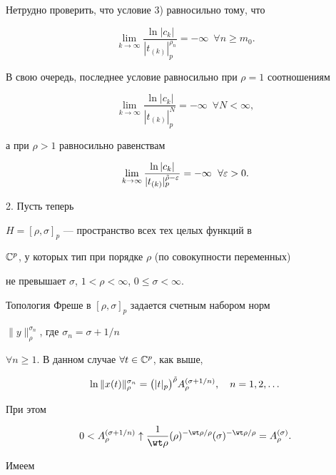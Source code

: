 Нетрудно проверить, что условие 3) равносильно тому, что


$$


\lim\limits_{k\to\infty}\dfrac{\ln|c_k|}{|t_{(k)}|_p^{\rho_n}}


= -\infty \ \; \forall n\geqslant m_0 .


$$


В свою очередь, последнее условие равносильно при $\rho=1$ соотношениям


$$


\lim\limits_{k\to\infty}\dfrac{\ln|c_k|}{|t_{(k)}|_p^N}


= -\infty\ \; \forall N<\infty,


$$


а при $\rho>1$ равносильно равенствам


$$


\lim\limits_{k\to\infty}\dfrac{\ln|c_k|}


{|t_{(k)}|_p^{\Tilde\rho-\varepsilon}}= -\infty\ \; \forall \varepsilon>0.


$$





2. Пусть теперь


$H=[\rho,\sigma]_p$ --- пространство всех тех целых функций в


$\Bbb C^p$, у которых тип при порядке $\rho$ (по совокупности переменных)


не превышает $\sigma$, $1<\rho<\infty$, $0\leqslant \sigma<\infty$.


Топология Фреше в $[\rho,\sigma]_p$ задается счетным набором норм


$\|y\|^{\sigma_n}_{\rho}$, где $\sigma _n=\sigma+1/n$


$\forall n\geqslant 1$. В данном случае $\forall t\in \Bbb C^p$, как выше,


$$


\ln\|x(t)\|^{\sigma_n}_{\rho}=\bigl(|t|_p\bigr)^{\Tilde\rho}


A^{(\sigma+1/n)}_{\rho},\quad n=1,2,\dotsc


$$


При этом


$$


0<A^{(\sigma+1/n)}_{\rho}\uparrow\dfrac{1}{\wt\rho}


(\rho)^{-\wt\rho/\rho}(\sigma)^{-\wt\rho/\rho}=


A^{(\sigma)}_{\rho}.


$$


Имеем 



